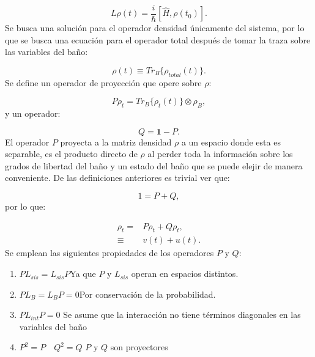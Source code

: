 \documentclass[a4paper,10pt]{report}
\begin{document}
\begin{equation}\label{defL}
L\rho(t) = \frac{i}{\hbar}[\hat{H},\rho(t_0)].
\end{equation} Se busca una solución para el operador densidad únicamente del sistema, por lo que se busca una ecuación para el operador total después de tomar la traza sobre las variables del baño:

\begin{equation}
\rho(t) \equiv Tr_B\{\rho_{total}(t)\}.
\end{equation} Se define un operador de proyección \cite{ZollerQN} que opere sobre $ \rho $:

\begin{equation}
P\rho_t = Tr_B\{\rho_{t}(t)\}\otimes \rho_B,
\end{equation} y un operador:

\begin{equation}
Q = \mathbf{1}-P.
\end{equation} El operador $P$ proyecta a la matriz densidad $\rho$ a un espacio donde esta es separable, es el producto directo de $\rho$ al perder toda la información sobre los grados de libertad del baño y un estado del baño que se puede elejir de manera conveniente. De las definiciones anteriores es trivial ver que:

\begin{equation}
1 = P + Q,
\end{equation} por lo que:

\begin{align}
\rho_t =& P\rho_t + Q\rho_t ,\\
\equiv & v(t)+u(t).
\end{align} Se emplean las siguientes propiedades de los operadores $P$ y $Q$:

\begin{enumerate}
\item $ PL_{sis} = L_{sis}P$\qquad Ya que $ P $ y $ L_{sis} $ operan en espacios distintos.

\item $ PL_{B} = L_{B}P = 0 $\qquad Por conservación de la probabilidad.

\item $PL_{int}P=0$ \qquad Se asume que la interacción no tiene términos diagonales en las variables del baño

\item $P^2 = P \quad Q^2 = Q$ \qquad $P$ y $Q$ son proyectores
\end{enumerate}
\end{document}

